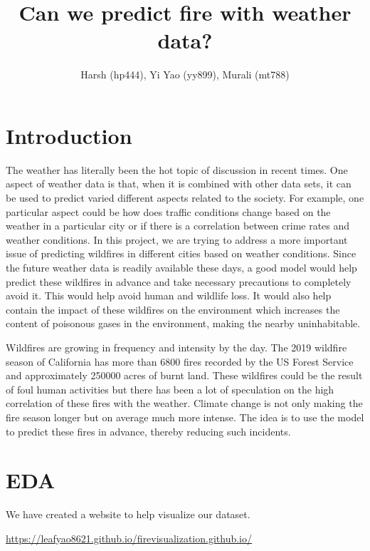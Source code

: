 \documentclass[10pt]{article}
\begin{document}
\title{\bf Can we predict fire with weather data?}
\author{Harsh (hp444), Yi Yao (yy899), Murali (mt788)}
\maketitle

\tableofcontents
\newpage

\section{Introduction}
The weather has literally been the hot topic of discussion in recent times.
One aspect of weather data is that, when it is combined with other data
sets, it can be used to predict varied different aspects related to
the society. For example, one particular aspect could be how does traffic
conditions change based on the weather in a particular city or if there is
a correlation between crime rates and weather conditions. In this project,
we are trying to address a more important issue of predicting wildfires in
different cities based on weather conditions. Since the future weather data
is readily available these days, a good model would help predict these
wildfires in advance and take necessary precautions to completely avoid it.
This would help avoid human and wildlife loss. It would also help contain
the impact of these wildfires on the environment which increases the
content of poisonous gases in the environment, making the nearby
uninhabitable.\par
Wildfires are growing in frequency and intensity by the day. The 2019
wildfire season of California has more than 6800 fires recorded by the US
Forest Service and approximately 250000 acres of burnt land. These
wildfires could be the result of foul human activities but there has been
a lot of speculation on the high correlation of these fires with the
weather. Climate change is not only making the fire season longer but on
average much more intense. The idea is to use the model to predict these
fires in advance, thereby reducing such incidents.\par
\section{EDA}

We have created a website to help visualize our dataset.\par 
\url{https://leafyao8621.github.io/firevisualization.github.io/}
\end{document}
